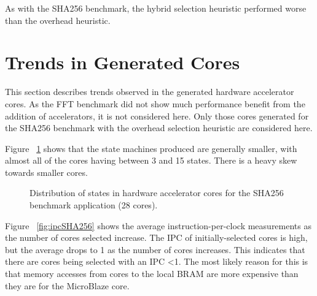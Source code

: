 \documentclass{UoYCSproject}
\begin{document}
As with the SHA256 benchmark, the hybrid selection heuristic performed worse than the overhead heuristic.

\section{Trends in Generated Cores}

This section describes trends observed in the generated hardware accelerator cores.
As the FFT benchmark did not show much performance benefit from the addition of accelerators,
it is not considered here. Only those cores generated for the SHA256 benchmark with
the overhead selection heuristic are considered here.

Figure ~\ref{fig:statesSHA256-28} shows that the state machines produced are generally smaller,
with almost all of the cores having between 3 and 15 states. There is a heavy skew towards smaller
cores.

\begin{figure}[H]
\caption{Distribution of states in hardware accelerator cores for the SHA256 benchmark application (28 cores).}
\label{fig:statesSHA256-28}
\end{figure}

Figure ~\ref{fig:ipcSHA256} shows the average instruction-per-clock measurements as
the number of cores selected increase. The IPC of initially-selected cores
is high, but the average drops to 1 as the number of cores increases. This indicates that
there are cores being selected with an IPC <1. The most likely reason for this is that
memory accesses from cores to the local BRAM are more expensive than they are for the
MicroBlaze core.
\end{document}
